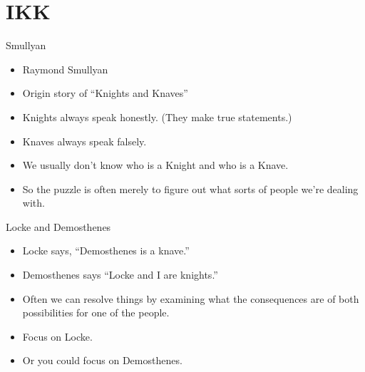 \documentclass[landscape]{beamer}
\begin{document}
\section{IKK}

\begin{frame}{Smullyan}
\begin{itemize}
\item Raymond Smullyan \pause
\item Origin story of ``Knights and Knaves'' \pause
\item Knights always speak honestly. \pause (They make true statements.) \pause
\item Knaves always speak falsely. \pause
\item We usually don't know who is a Knight and who is a Knave. \pause 
\item So the puzzle is often merely to figure out what sorts of people we're dealing with.
\end{itemize}
\end{frame}

\begin{frame}{Locke and Demosthenes}
\begin{itemize}
\item Locke says, ``Demosthenes is a knave.'' 
\item Demosthenes says ``Locke and I are knights.'' \pause
\item Often we can resolve things by examining what the consequences are of both possibilities for one of the people.\pause
\item Focus on Locke. \pause
\item Or you could focus on Demosthenes.
\end{itemize}
\end{frame}
\end{document}

